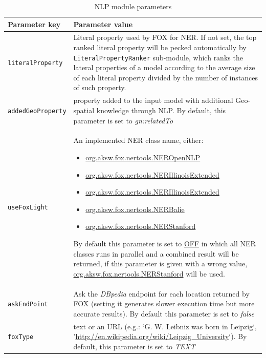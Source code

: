 \documentclass[a4paper,twoside,bibtotoc,abstracton,12pt,BCOR=15mm]{article}
\begin{document}
\begin{table}
\caption{NLP module parameters} \label{tbl:nlpPram}
\small
\begin{tabularx}{\textwidth}{@{}lX@{}}
\toprule
\textbf{Parameter key} 	& \textbf{Parameter value} \\
\toprule
\texttt{literalProperty}	& Literal property used by FOX for NER. If not set, the top ranked literal property will be pecked automatically by \texttt{LiteralPropertyRanker} sub-module, which ranks the  lateral properties of a model according to the average size of each literal property divided by the number of instances of such property.\\
\midrule
\texttt{addedGeoProperty}& property added to the input model with additional Geo-spatial knowledge through NLP. By default, this parameter is set to \emph{gn:relatedTo\footnotemark[11]}\\
\midrule
\texttt{useFoxLight} 	& An implemented NER class name, either: 
			  \begin{itemize}
			      \itemsep-0.5em
			      \item \url{org.aksw.fox.nertools.NEROpenNLP}
			      \item \url{org.aksw.fox.nertools.NERIllinoisExtended}
			      \item \url{org.aksw.fox.nertools.NERIllinoisExtended}
			      \item \url{org.aksw.fox.nertools.NERBalie}
			      \item \url{org.aksw.fox.nertools.NERStanford}
			  \end{itemize}
			  By default this parameter is set to \url{OFF} in which all NER classes runs in parallel and a combined result will be returned, if this parameter is given with a wrong value, \url{org.aksw.fox.nertools.NERStanford} will be used. \\
\midrule
\texttt{askEndPoint} 	& Ask the \emph{DBpedia} endpoint for each location returned by FOX (setting it generates slower execution time but more accurate results). By default this parameter is set to \emph{false}\\
\midrule
\texttt{foxType} 	&  text or an URL (e.g.: `G. W. Leibniz was born in Leipzig`, '\url{http://en.wikipedia.org/wiki/Leipzig_University}`). By default, this parameter is set to \emph{TEXT} \\

\end{tabularx}
\end{table}
\end{document}
